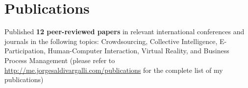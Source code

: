 
\section{Publications}

Published \textbf{12 peer-reviewed papers} in relevant international conferences and journals in the following topics: Crowdsourcing, Collective Intelligence, E-Participation, Human-Computer Interaction, Virtual Reality, and Business Process Management (please refer to \url{http://me.jorgesaldivargalli.com/publications} for the complete list of my publications)

%
%
%
%
%
%
%
%

